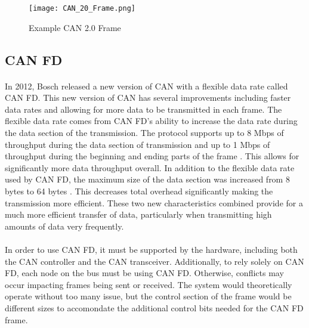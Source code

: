 \begin{figure}[H]
	\centering
	\texttt{[image: CAN\_20\_Frame.png]}
	\caption{Example CAN 2.0 Frame \cite{wikipediaCAN}}
	\label{fig:CANDataFrame}
\end{figure}

\subsection{CAN FD}

\paragraph{}
In 2012, Bosch released a new version of CAN with a flexible data rate called CAN FD.
This new version of CAN has several improvements including faster data rates and allowing for more data to be transmitted in each frame.
The flexible data rate comes from CAN FD's ability to increase the data rate during the data section of the transmission.
The protocol supports up to 8 Mbps of throughput during the data section of transmission and up to 1 Mbps of throughput during the beginning and ending parts of the frame \cite{BOSCH_CANFD}.
This allows for significantly more data throughput overall.
In addition to the flexible data rate used by CAN FD, the maximum size of the data section was increased from 8 bytes to 64 bytes \cite{BOSCH_CANFD}.
This decreases total overhead significantly making the transmission more efficient.
These two new characteristics combined provide for a much more efficient transfer of data, particularly when transmitting high amounts of data very frequently.

\paragraph{}
In order to use CAN FD, it must be supported by the hardware, including both the CAN controller and the CAN transceiver.
Additionally, to rely solely on CAN FD, each node on the bus must be using CAN FD.
Otherwise, conflicts may occur impacting frames being sent or received.
The system would theoretically operate without too many issue, but the control section of the frame would be different sizes to accomondate the additional control bits needed for the CAN FD frame.